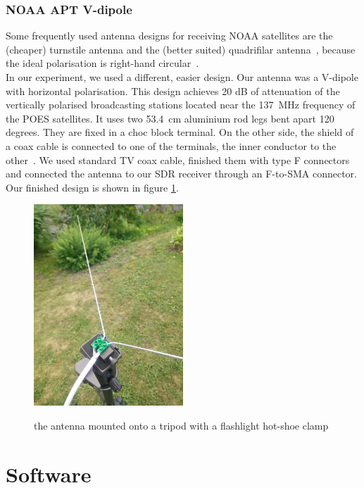 \documentclass[conference]{IEEEtran}
\begin{document}
\subsubsection{NOAA APT V-dipole} \label{sec:NOAAantennas}
Some frequently used antenna designs for receiving NOAA satellites are the (cheaper) turnstile antenna and the (better suited) quadrifilar antenna~\cite[45p]{NOAA19building}, because the ideal polarisation is right-hand circular~\cite[44p]{NOAA19building}.\\
In our experiment, we used a different, easier design. Our antenna was a V-dipole with horizontal polarisation. This design achieves 20 dB of attenuation of the vertically polarised broadcasting stations located near the 137~MHz frequency of the POES satellites. It uses two 53.4~cm aluminium rod legs bent apart 120 degrees. They are fixed in a choc block terminal. On the other side, the shield of a coax cable is connected to one of the terminals, the inner conductor to the other~\cite{Adam15antenna}. We used standard TV coax cable, finished them with type F connectors and connected the antenna to our SDR receiver through an F-to-SMA connector. Our finished design is shown in figure \ref{fig:vdipolefinished}.
\begin{figure}
	\centering
	\caption{the antenna mounted onto a tripod with a flashlight hot-shoe clamp}
	\includegraphics[width=0.5\textwidth]{v-dipole-finished} \label{fig:vdipolefinished}
\end{figure}

\section{Software} %
\end{document}
